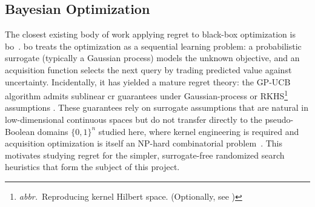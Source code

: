 
\subsection{Bayesian Optimization}

The closest existing body of work applying regret to black-box
optimization is \acrfull{bo}~\cite{jones1998efficient,
shahriari2015taking, frazier2018tutorial}. \acrshort{bo} treats the optimization
as a sequential learning problem: a probabilistic surrogate
(typically a Gaussian process) models the unknown objective, and an
acquisition function selects the next query by trading predicted
value against uncertainty. Incidentally, it has yielded a mature regret
theory: the GP-UCB algorithm admits sublinear \acrshort{cr}
guarantees under Gaussian-process or
RKHS\footnote{\textit{abbr.}~Reproducing kernel Hilbert space.
(Optionally, see \cite{ghojogh2021reproducing})} assumptions
\cite{srinivas2009gaussian, chowdhury2017kernelized, scarlett2017lower}.
These guarantees rely on surrogate assumptions
that are natural in low-dimensional continuous spaces but do not
transfer directly to the pseudo-Boolean domains $\{0,1\}^n$ studied
here, where kernel engineering is required and acquisition
optimization is itself an NP-hard combinatorial
problem~\cite{shahriari2015taking}. This motivates studying regret
for the simpler, surrogate-free randomized search heuristics
that form the subject of this project.
